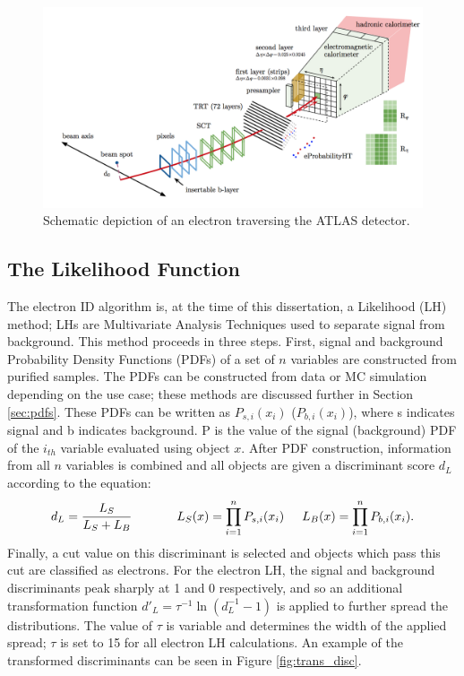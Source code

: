 \begin{figure}[h]
    \centering
    \includegraphics[width=5in]{figures/chapter5/elec_in_detec.png}
    \caption{Schematic depiction of an electron traversing the ATLAS detector.}
    \label{elec_detec}
\end{figure}

\subsection{The Likelihood Function}
The electron ID algorithm is, at the time of this dissertation, a Likelihood (LH) method; LHs are Multivariate Analysis Techniques used to separate signal from background. This method proceeds in three steps. First, signal and background Probability Density Functions (PDFs) of a set of $n$ variables are constructed from purified samples. The PDFs can be constructed from data or MC simulation depending on the use case; these methods are discussed further in Section \ref{sec:pdfs}. These PDFs can be written as $P_{s,i}(x_i)$ ($P_{b,i}(x_i)$), where s indicates signal and b indicates background. P is the value of the signal (background) PDF of the $i_{th}$ variable evaluated using object $x$. After PDF construction, information from all $n$ variables is combined and all objects are given a discriminant score $d_L$ according to the equation: 
$$d_L=\frac{L_S}{L_S+L_B} \hspace{.5in} L_S(x)=\prod_{i=1}^{n}P_{s,i}(x_i) \hspace{.2in} L_B(x)=\prod_{i=1}^{n}P_{b,i}(x_i).$$
Finally, a cut value on this discriminant is selected and objects which pass this cut are classified as electrons. For the electron LH, the signal and background discriminants peak sharply at 1 and 0 respectively, and so an additional transformation function $d'_L=\tau^{-1}\ln(d_L^{-1}-1)$ is applied to further spread the distributions. The value of $\tau$ is variable and determines the width of the applied spread; $\tau$ is set to 15 for all electron LH calculations. An example of the transformed discriminants can be seen in Figure \ref{fig:trans_disc}.\\

